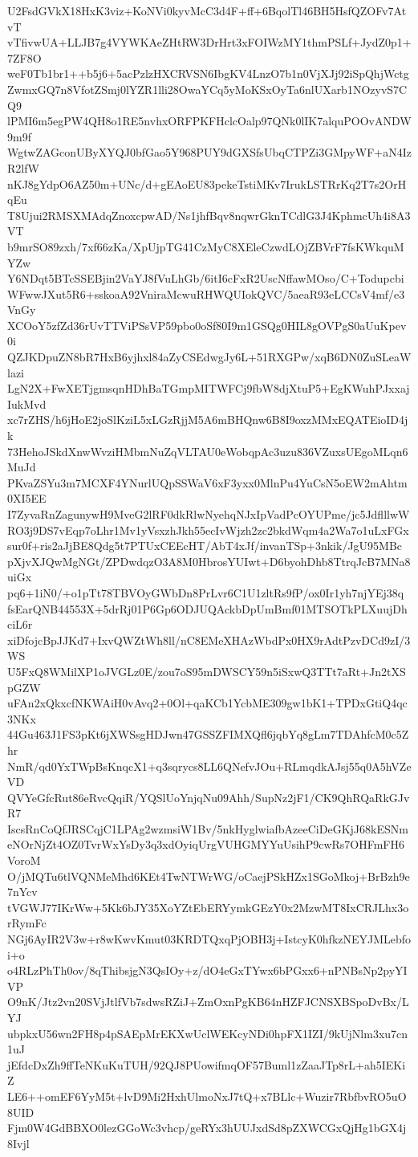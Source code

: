 U2FsdGVkX18HxK3viz+KoNVi0kyvMcC3d4F+ff+6BqolTl46BH5HsfQZOFv7AtvT
vTfivwUA+LLJB7g4VYWKAeZHtRW3DrHrt3xFOIWzMY1thmPSLf+JydZ0p1+7ZF8O
weF0Tb1br1++b5j6+5acPzlzHXCRVSN6IbgKV4LnzO7b1n0VjXJj92iSpQhjWctg
ZwmxGQ7n8VfotZSmj0lYZR1lli28OwaYCq5yMoKSxOyTa6nlUXarb1NOzyvS7CQ9
lPMI6m5egPW4QH8o1RE5nvhxORFPKFHclcOalp97QNk0lIK7alquPOOvANDW9m9f
WgtwZAGconUByXYQJ0bfGao5Y968PUY9dGXSfsUbqCTPZi3GMpyWF+aN4IzR2lfW
nKJ8gYdpO6AZ50m+UNc/d+gEAoEU83pekeTstiMKv7IrukLSTRrKq2T7s2OrHqEu
T8Ujui2RMSXMAdqZnoxcpwAD/Ns1jhfBqv8nqwrGknTCdlG3J4KphmcUh4i8A3VT
b9mrSO89zxh/7xf66zKa/XpUjpTG41CzMyC8XEleCzwdLOjZBVrF7fsKWkquMYZw
Y6NDqt5BTcSSEBjin2VaYJ8fVuLhGb/6itI6cFxR2UscNffawMOso/C+Todupcbi
WFwwJXut5R6+sskoaA92VniraMcwuRHWQUIokQVC/5aeaR93eLCCsV4mf/e3VnGy
XCOoY5zfZd36rUvTTViPSsVP59pbo0oSf80I9m1GSQg0HIL8gOVPgS0aUuKpev0i
QZJKDpuZN8bR7HxB6yjhxl84aZyCSEdwgJy6L+51RXGPw/xqB6DN0ZuSLeaWlazi
LgN2X+FwXETjgmsqnHDhBaTGmpMITWFCj9fbW8djXtuP5+EgKWuhPJxxajIukMvd
xc7rZHS/h6jHoE2joSlKziL5xLGzRjjM5A6mBHQnw6B8I9oxzMMxEQATEioID4jk
73HehoJSkdXnwWvziHMbmNuZqVLTAU0eWobqpAc3uzu836VZuxsUEgoMLqn6MuJd
PKvaZSYu3m7MCXF4YNurlUQpSSWaV6xF3yxx0MlnPu4YuCsN5oEW2mAhtm0XI5EE
I7ZyvaRnZagunywH9MveG2lRF0dkRlwNyehqNJxIpVadPcOYUPme/jc5JdflllwW
RO3j9DS7vEqp7oLhr1Mv1yVsxzhJkh55ecIvWjzh2zc2bkdWqm4a2Wa7o1uLxFGx
sur0f+ris2aJjBE8Qdg5t7PTUxCEEcHT/AbT4xJf/invanTSp+3nkik/JgU95MBc
pXjvXJQwMgNGt/ZPDwdqzO3A8M0HbrosYUIwt+D6byohDhb8TtrqJcB7MNa8uiGx
pq6+1iN0/+o1pTt78TBVOyGWbDn8PrLvr6C1U1zltRs9fP/ox0Ir1yh7njYEj38q
fsEarQNB44553X+5drRj01P6Gp6ODJUQAckbDpUmBmf01MTSOTkPLXuujDhciL6r
xiDfojcBpJJKd7+IxvQWZtWh8ll/nC8EMeXHAzWbdPx0HX9rAdtPzvDCd9zI/3WS
U5FxQ8WMilXP1oJVGLz0E/zou7oS95mDWSCY59n5iSxwQ3TTt7aRt+Jn2tXSpGZW
uFAn2xQkxcfNKWAiH0vAvq2+0Ol+qaKCb1YcbME309gw1bK1+TPDxGtiQ4qc3NKx
44Gu463J1FS3pKt6jXWSsgHDJwn47GSSZFIMXQfl6jqbYq8gLm7TDAhfcM0c5Zhr
NmR/qd0YxTWpBsKnqcX1+q3sqrycs8LL6QNefvJOu+RLmqdkAJsj55q0A5hVZeVD
QVYeGfcRut86eRvcQqiR/YQSlUoYnjqNu09Ahh/SupNz2jF1/CK9QhRQaRkGJvR7
IscsRnCoQfJRSCqjC1LPAg2wzmsiW1Bv/5nkHyglwiafbAzeeCiDeGKjJ68kESNm
eNOrNjZt4OZ0TvrWxYsDy3q3xdOyiqUrgVUHGMYYuUsihP9cwRs7OHFmFH6VoroM
O/jMQTu6tlVQNMeMhd6KEt4TwNTWrWG/oCaejPSkHZx1SGoMkoj+BrBzh9e7nYcv
tVGWJ77IKrWw+5Kk6bJY35XoYZtEbERYymkGEzY0x2MzwMT8IxCRJLhx3orRymFc
NGj6AyIR2V3w+r8wKwvKmut03KRDTQxqPjOBH3j+IstcyK0hfkzNEYJMLebfoi+o
o4RLzPhTh0ov/8qThibsjgN3QsIOy+z/dO4eGxTYwx6bPGxx6+nPNBsNp2pyYIVP
O9nK/Jtz2vn20SVjJtlfVb7sdwsRZiJ+ZmOxnPgKB64nHZFJCNSXBSpoDvBx/LYJ
ubpkxU56wn2FH8p4pSAEpMrEKXwUclWEKcyNDi0hpFX1IZI/9kUjNlm3xu7cn1uJ
jEfdcDxZh9ffTeNKuKuTUH/92QJ8PUowifmqOF57Buml1zZaaJTp8rL+ah5IEKiZ
LE6++omEF6YyM5t+lvD9Mi2HxhUlmoNxJ7tQ+x7BLlc+Wuzir7RbfbvRO5uO8UID
Fjm0W4GdBBXO0lezGGoWc3vhcp/geRYx3hUUJxdSd8pZXWCGxQjHg1bGX4j8Ivjl
